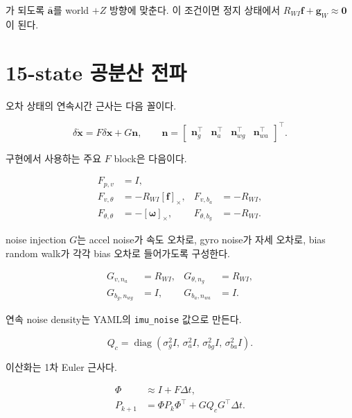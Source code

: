 \documentclass[11pt,a4paper,oneside]{report}
\begin{document}
가 되도록 \(\bar{\mathbf{a}}\)를 world \(+Z\) 방향에 맞춘다. 이 조건이면 정지 상태에서
\(R_{WI}\mathbf{f}+\mathbf{g}_W \approx \mathbf{0}\)이 된다.

\section{15-state 공분산 전파}

오차 상태의 연속시간 근사는 다음 꼴이다.

\begin{equation}
\delta\dot{\mathbf{x}} = F\delta\mathbf{x} + G\mathbf{n},
\qquad
\mathbf{n} =
\begin{bmatrix}
\mathbf{n}_g^{\top} &
\mathbf{n}_a^{\top} &
\mathbf{n}_{wg}^{\top} &
\mathbf{n}_{wa}^{\top}
\end{bmatrix}^{\top}.
\end{equation}

구현에서 사용하는 주요 \(F\) block은 다음이다.

\begin{align}
F_{p,v} &= I, \\
F_{v,\theta} &= -R_{WI}[\mathbf{f}]_{\times}, &
F_{v,b_a} &= -R_{WI}, \\
F_{\theta,\theta} &= -[\boldsymbol{\omega}]_{\times}, &
F_{\theta,b_g} &= -R_{WI}.
\end{align}

noise injection \(G\)는 accel noise가 속도 오차로, gyro noise가 자세 오차로,
bias random walk가 각각 bias 오차로 들어가도록 구성한다.

\begin{align}
G_{v,n_a} &= R_{WI}, &
G_{\theta,n_g} &= R_{WI}, \\
G_{b_g,n_{wg}} &= I, &
G_{b_a,n_{wa}} &= I.
\end{align}

연속 noise density는 YAML의 \texttt{imu\_noise} 값으로 만든다.

\begin{equation}
Q_c =
\operatorname{diag}
\left(
\sigma_g^2 I,\,
\sigma_a^2 I,\,
\sigma_{bg}^2 I,\,
\sigma_{ba}^2 I
\right).
\end{equation}

이산화는 1차 Euler 근사다.

\begin{align}
\Phi &\approx I + F\Delta t, \\
P_{k+1} &= \Phi P_k \Phi^{\top}
        + GQ_cG^{\top}\Delta t.
\end{align}
\end{document}
